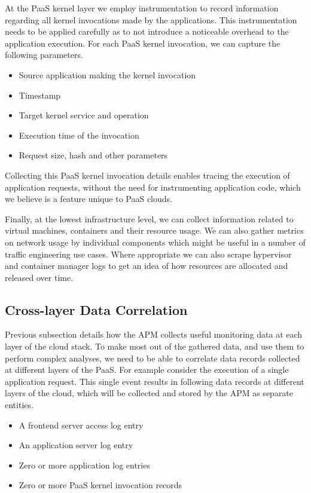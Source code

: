\documentclass[11pt]{article}
\begin{document}
At the PaaS kernel layer we employ instrumentation to record information regarding all kernel invocations
made by the applications. This instrumentation needs to be applied carefully as to not introduce a noticeable
overhead to the application execution. For each PaaS kernel invocation, we can capture the 
following parameters.
\begin{itemize}
\item Source application making the kernel invocation
\item Timestamp
\item Target kernel service and operation
\item Execution time of the invocation
\item Request size, hash and other parameters
\end{itemize}
Collecting this PaaS kernel invocation details enables tracing the execution of application 
requests, without the need for instrumenting application code, which we believe is a feature 
unique to PaaS clouds. 

Finally, at the lowest infrastructure level, we can collect information related to virtual machines, containers
and their resource usage. We can also gather metrics on network usage by individual components which
might be useful in a number of traffic engineering use cases. Where appropriate we can also scrape
hypervisor and container manager logs to get an idea of how resources are allocated and released over
time.

\subsection{Cross-layer Data Correlation}
Previous subsection details how the APM collects useful monitoring data at each layer of the cloud
stack. To make most out of the gathered data, and use them to perform complex analyses, we need
to be able to correlate data records collected at different layers of the PaaS. For example consider
the execution of a single application request. This single event results in following data records at
different layers of the cloud, which will be collected and stored by the APM as separate entities.

\begin{itemize}
\item A frontend server access log entry
\item An application server log entry
\item Zero or more application log entries
\item Zero or more PaaS kernel invocation records
\end{itemize}
\end{document}
